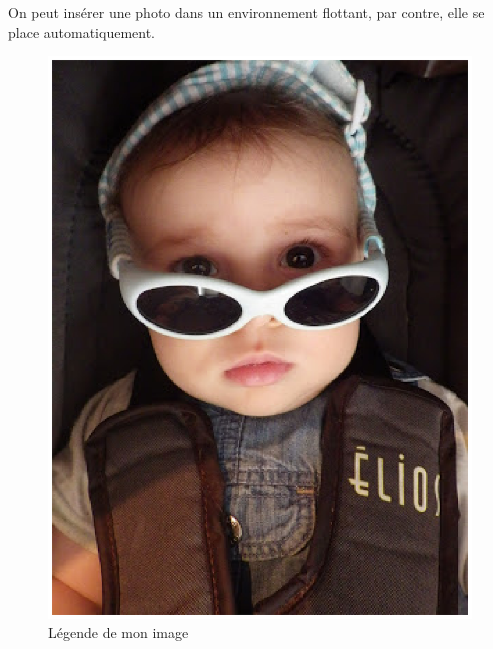 \documentclass[10pt,a4paper]{article}
\begin{document}
On peut insérer une photo dans un environnement flottant, par contre, elle se place automatiquement.

\begin{figure}[H!]
	\center
	\includegraphics[width=0.2\columnwidth]{images/arthur.ps}
	\caption{Légende de mon image}
	\label{fig:arthur}
\end{figure}
\end{document}

